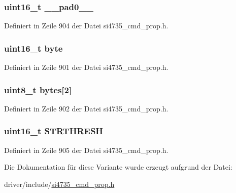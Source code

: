 \subsubsection[{\+\_\+\+\_\+pad0\+\_\+\+\_\+}]{\setlength{\rightskip}{0pt plus 5cm}uint16\+\_\+t \+\_\+\+\_\+pad0\+\_\+\+\_\+}\label{unionfm__blend__multi__stereo__thres_a77132c2c26a75f5b8751b235cda23828}


Definiert in Zeile 904 der Datei si4735\+\_\+cmd\+\_\+prop.\+h.

\hypertarget{unionfm__blend__multi__stereo__thres_ab0549c1b5ea980a02e7eab77e21fea49}{}
\subsubsection[{byte}]{\setlength{\rightskip}{0pt plus 5cm}uint16\+\_\+t byte}\label{unionfm__blend__multi__stereo__thres_ab0549c1b5ea980a02e7eab77e21fea49}


Definiert in Zeile 901 der Datei si4735\+\_\+cmd\+\_\+prop.\+h.

\hypertarget{unionfm__blend__multi__stereo__thres_a46e4c05d20a047ec169f60d3167e912e}{}
\subsubsection[{bytes}]{\setlength{\rightskip}{0pt plus 5cm}uint8\+\_\+t bytes\mbox{[}2\mbox{]}}\label{unionfm__blend__multi__stereo__thres_a46e4c05d20a047ec169f60d3167e912e}


Definiert in Zeile 902 der Datei si4735\+\_\+cmd\+\_\+prop.\+h.

\hypertarget{unionfm__blend__multi__stereo__thres_ae59cc6ed2c20ceb75c5065984e1751d1}{}
\subsubsection[{S\+T\+R\+T\+H\+R\+E\+S\+H}]{\setlength{\rightskip}{0pt plus 5cm}uint16\+\_\+t S\+T\+R\+T\+H\+R\+E\+S\+H}\label{unionfm__blend__multi__stereo__thres_ae59cc6ed2c20ceb75c5065984e1751d1}


Definiert in Zeile 905 der Datei si4735\+\_\+cmd\+\_\+prop.\+h.



Die Dokumentation für diese Variante wurde erzeugt aufgrund der Datei\+:\begin{DoxyCompactItemize}
\item 
driver/include/\hyperlink{si4735__cmd__prop_8h}{si4735\+\_\+cmd\+\_\+prop.\+h}\end{DoxyCompactItemize}
